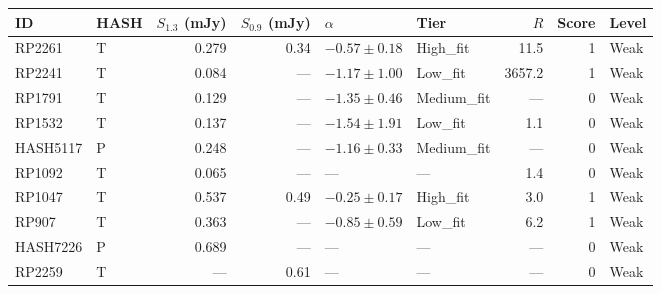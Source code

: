 \begin{tabular}{llrrllrrl}
\toprule
ID & HASH & $S_{1.3}$ (mJy) & $S_{0.9}$ (mJy) & $\alpha$ & Tier & $R$ & Score & Level \\
\midrule
RP2261 & T & 0.279 & 0.34 & $-0.57\pm0.18$ & High\_fit & 11.5 & 1 & Weak \\
RP2241 & T & 0.084 & --- & $-1.17\pm1.00$ & Low\_fit & 3657.2 & 1 & Weak \\
RP1791 & T & 0.129 & --- & $-1.35\pm0.46$ & Medium\_fit & --- & 0 & Weak \\
RP1532 & T & 0.137 & --- & $-1.54\pm1.91$ & Low\_fit & 1.1 & 0 & Weak \\
HASH5117 & P & 0.248 & --- & $-1.16\pm0.33$ & Medium\_fit & --- & 0 & Weak \\
RP1092 & T & 0.065 & --- & --- & --- & 1.4 & 0 & Weak \\
RP1047 & T & 0.537 & 0.49 & $-0.25\pm0.17$ & High\_fit & 3.0 & 1 & Weak \\
RP907 & T & 0.363 & --- & $-0.85\pm0.59$ & Low\_fit & 6.2 & 1 & Weak \\
HASH7226 & P & 0.689 & --- & --- & --- & --- & 0 & Weak \\
RP2259 & T & --- & 0.61 & --- & --- & --- & 0 & Weak \\
\bottomrule
\end{tabular}
